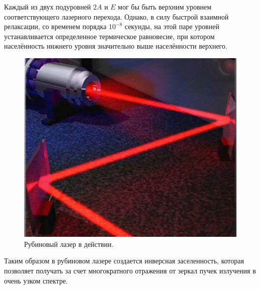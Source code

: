 \documentclass[a4paper,12pt]{article}
\theoremstyle{plain} %
\theoremstyle{definition} %
\theoremstyle{remark} %
\begin{document}
  Каждый из двух подуровней $2A$ и $E$   мог бы быть верхним уровнем соответствующего лазерного перехода. Однако, в силу быстрой взаимной релаксации, со временем порядка $10^{-8}$ секунды, на этой паре уровней устанавливается определенное термическое равновесие, при котором населённость нижнего уровня 
 значительно выше населённости верхнего.
 
\begin{figure}[h!]
	\centering
	\includegraphics[scale=2]{pict4.png}
	\caption{Рубиновый лазер в действии.}
	\label{fig:2sistem3}
\end{figure}

Таким образом в рубиновом лазере создается инверсная заселенность, которая позволяет получать за счет многократного отражения от зеркал пучек излучения в очень узком спектре.
\end{document}
